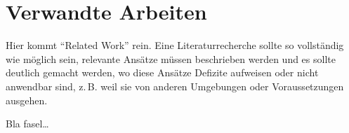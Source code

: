 

\section{Verwandte Arbeiten}
\label{ch:Grundlagen:sec:RelatedWork}
Hier kommt "`Related Work"' rein.
Eine Literaturrecherche sollte so vollständig wie möglich sein, relevante Ansätze müssen beschrieben werden und es sollte deutlich gemacht werden, wo diese Ansätze Defizite aufweisen oder nicht anwendbar sind, z.\,B. weil sie von anderen Umgebungen oder Voraussetzungen ausgehen.


Bla fasel\ldots

